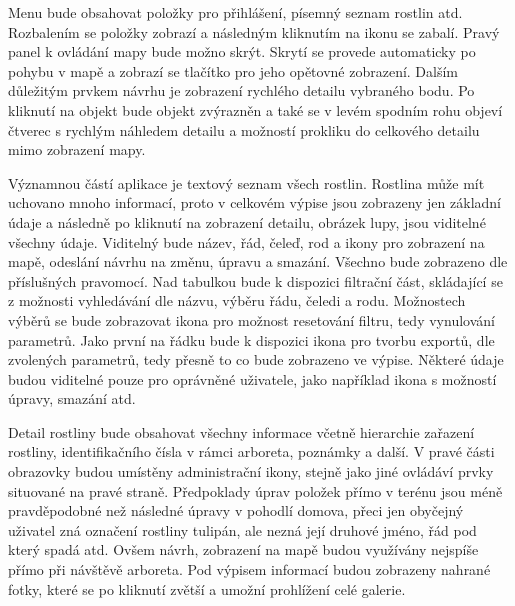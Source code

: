 \documentclass[12pt]{article}%
\begin{document}
{{Menu bude obsahovat položky pro přihlášení, písemný seznam rostlin atd. Rozbalením se položky 
zobrazí a následným kliknutím na ikonu se zabalí. Pravý panel k ovládání mapy bude možno skrýt. 
Skrytí se provede automaticky po pohybu v mapě a zobrazí se tlačítko pro jeho opětovné zobrazení. 
Dalším důležitým prvkem návrhu je zobrazení rychlého detailu vybraného bodu. Po kliknutí na objekt 
bude objekt zvýrazněn a také se v levém spodním rohu objeví čtverec s rychlým náhledem detailu 
a možností prokliku do celkového detailu mimo zobrazení mapy.

\newpage
\obrazek
{}

\obrazek
{}
\newpage

Významnou částí aplikace je textový seznam všech rostlin. Rostlina může mít uchovano mnoho
informací, proto v celkovém výpise jsou zobrazeny jen základní údaje a následně po kliknutí 
na zobrazení detailu, obrázek lupy, jsou viditelné všechny údaje. Viditelný bude název, řád, čeleď, 
rod a ikony pro zobrazení na mapě, odeslání návrhu na změnu, úpravu a smazání. Všechno bude 
zobrazeno dle příslušných pravomocí. Nad tabulkou bude k dispozici filtrační část, skládající se 
z možnosti vyhledávání dle názvu, výběru řádu, čeledi a rodu. Možnostech výběrů se bude zobrazovat 
ikona pro možnost resetování filtru, tedy vynulování parametrů. Jako první na řádku bude k dispozici 
ikona pro tvorbu exportů, dle zvolených parametrů, tedy přesně to co bude zobrazeno ve výpise. 
Některé údaje budou viditelné pouze pro oprávněné uživatele, jako například ikona s možností úpravy, 
smazání atd.

\newpage
\obrazek
{}

Detail rostliny bude obsahovat všechny informace včetně hierarchie zařazení rostliny, 
identifikačního čísla v rámci arboreta, poznámky a další. V pravé části obrazovky budou umístěny 
administrační ikony, stejně jako jiné ovládáví prvky situované na pravé straně. Předpoklady úprav 
položek přímo v terénu jsou méně pravděpodobné než následné úpravy v pohodlí domova, přeci jen 
obyčejný uživatel zná označení rostliny tulipán, ale nezná její druhové jméno, řád pod který spadá 
atd. Ovšem návrh, zobrazení na mapě budou využívány nejspíše přímo při návštěvě arboreta. Pod 
výpisem informací budou zobrazeny nahrané fotky, které se po kliknutí zvětší a umožní prohlížení 
celé galerie.

}}
\end{document}
